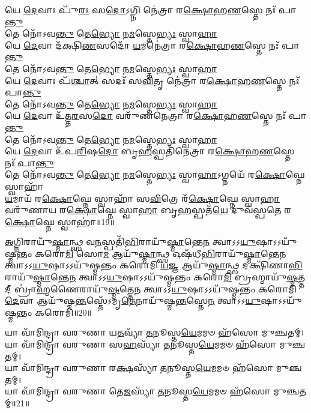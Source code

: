 𑌯𑍇 \ul{𑌦𑍇}\-𑌵𑌾𑌃 𑌪𑍁᳴\-\ul{𑌰𑌃} 𑌸\-\ul{𑌦𑍋}\-𑌽𑌗𑍍𑌨𑌿 𑌨𑍇॑𑌤𑍍𑌰𑌾 𑌰\-\ul{𑌕𑍍𑌷𑍋}\-𑌹\-\ul{𑌣}\-𑌸𑍍𑌤𑍇 𑌨𑌃᳴ 𑌪𑌾\-\ul{𑌨𑍍𑌤𑍁}\-\\
𑌤𑍇 𑌨𑍋᳴𑌽𑌵\-\ul{𑌨𑍍𑌤𑍁}  𑌤𑍇\-\ul{𑌭𑍍𑌯𑍋} 𑌨\-\ul{𑌮}\-𑌸𑍍𑌤𑍇\-\ul{𑌭𑍍𑌯𑌃} 𑌸𑍍𑌵𑌾\-\ul{𑌹𑌾}\-\\
𑌯𑍇 \ul{𑌦𑍇}\-𑌵𑌾 𑌦᳴𑌕𑍍𑌷𑌿\-\ul{𑌣}\-𑌸𑌦𑍋᳴ \ul{𑌯}\-𑌮𑌨𑍇॑𑌤𑍍𑌰𑌾 𑌰\-\ul{𑌕𑍍𑌷𑍋}\-𑌹\-\ul{𑌣}\-𑌸𑍍𑌤𑍇 𑌨𑌃᳴ 𑌪𑌾\-\ul{𑌨𑍍𑌤𑍁}\-\\
𑌤𑍇 𑌨𑍋᳴𑌽𑌵\-\ul{𑌨𑍍𑌤𑍁}  𑌤𑍇\-\ul{𑌭𑍍𑌯𑍋} 𑌨\-\ul{𑌮}\-𑌸𑍍𑌤𑍇\-\ul{𑌭𑍍𑌯𑌃} 𑌸𑍍𑌵𑌾\-\ul{𑌹𑌾}\-\\
𑌯𑍇 \ul{𑌦𑍇}\-𑌵𑌾𑌃 𑌪᳴\-\ul{𑌶𑍍𑌚𑌾}\-𑌤𑍍 𑌸𑌦𑌃᳴ 𑌸\-\ul{𑌵𑌿}\-𑌤𑍃 𑌨𑍇॑𑌤𑍍𑌰𑌾 𑌰\-\ul{𑌕𑍍𑌷𑍋}\-𑌹\-\ul{𑌣}\-𑌸𑍍𑌤𑍇 𑌨𑌃᳴ 𑌪𑌾\-\ul{𑌨𑍍𑌤𑍁}\-\\
𑌤𑍇 𑌨𑍋᳴𑌽𑌵\-\ul{𑌨𑍍𑌤𑍁}  𑌤𑍇\-\ul{𑌭𑍍𑌯𑍋} 𑌨\-\ul{𑌮}\-𑌸𑍍𑌤𑍇\-\ul{𑌭𑍍𑌯𑌃} 𑌸𑍍𑌵𑌾\-\ul{𑌹𑌾}\-\\
𑌯𑍇 \ul{𑌦𑍇}\-𑌵𑌾 𑌉᳴𑌤𑍍𑌤\-\ul{𑌰}\-𑌸\-\ul{𑌦𑍋} 𑌵𑌰𑍁᳴𑌣𑌨𑍇𑌤𑍍𑌰𑌾 𑌰\-\ul{𑌕𑍍𑌷𑍋}\-𑌹\-\ul{𑌣}\-𑌸𑍍𑌤𑍇 𑌨𑌃᳴ 𑌪𑌾\-\ul{𑌨𑍍𑌤𑍁}\-\\
𑌤𑍇 𑌨𑍋᳴𑌽𑌵\-\ul{𑌨𑍍𑌤𑍁}  𑌤𑍇\-\ul{𑌭𑍍𑌯𑍋} 𑌨\-\ul{𑌮}\-𑌸𑍍𑌤𑍇\-\ul{𑌭𑍍𑌯𑌃} 𑌸𑍍𑌵𑌾\-\ul{𑌹𑌾}\-\\
𑌯𑍇 \ul{𑌦𑍇}\-𑌵𑌾 𑌉᳴𑌪\-\ul{𑌰𑌿}\-𑌷\-\ul{𑌦𑍋} 𑌬𑍃\-\ul{𑌹}\-𑌸𑍍𑌪𑌤𑌿᳴𑌨𑍇𑌤𑍍𑌰𑌾 𑌰\-\ul{𑌕𑍍𑌷𑍋}\-𑌹\-\ul{𑌣}\-𑌸𑍍𑌤𑍇 𑌨𑌃᳴ 𑌪𑌾\-\ul{𑌨𑍍𑌤𑍁}\-\\
𑌤𑍇 𑌨𑍋᳴𑌽𑌵\-\ul{𑌨𑍍𑌤𑍁}  𑌤𑍇\-\ul{𑌭𑍍𑌯𑍋} 𑌨\-\ul{𑌮}\-𑌸𑍍𑌤𑍇\-\ul{𑌭𑍍𑌯𑌃} 𑌸𑍍𑌵𑌾\-\ul{𑌹𑌾}\-𑌽𑌗𑍍𑌨𑌯𑍇᳴ 𑌰\-\ul{𑌕𑍍𑌷𑍋}\-𑌘𑍍𑌨𑍇 𑌸𑍍𑌵𑌾𑌹𑌾᳴\\
\-\ul{𑌯}\-𑌮𑌾𑌯᳴ 𑌰\-\ul{𑌕𑍍𑌷𑍋}\-𑌘𑍍𑌨𑍇 𑌸𑍍𑌵𑌾𑌹𑌾᳴ 𑌸\-\ul{𑌵𑌿}\-𑌤𑍍𑌰𑍇 𑌰᳴\-\ul{𑌕𑍍𑌷𑍋}\-𑌘𑍍𑌨𑍇 𑌸𑍍𑌵𑌾\-\ul{𑌹𑌾}\-\\
𑌵𑌰𑍁᳴𑌣𑌾𑌯 𑌰\-\ul{𑌕𑍍𑌷𑍋}\-𑌘𑍍𑌨𑍇 𑌸𑍍𑌵𑌾\-\ul{𑌹𑌾} 𑌬𑍃\-\ul{𑌹}\-𑌸𑍍𑌪𑌤᳴\-\ul{𑌯𑍇} 𑌦𑍁𑌵᳴𑌸𑍍𑌪𑌤𑍇 𑌰\-\ul{𑌕𑍍𑌷𑍋}\-𑌘𑍍𑌨𑍇 𑌸𑍍𑌵𑌾𑌹𑌾॑॥19॥

\-\ul{𑌅}\-𑌗𑍍𑌨𑌿𑌰𑌾𑌯𑍁᳴\-\ul{𑌷𑍍𑌮𑌾}\-𑌨𑍍𑌥𑍍𑌸 𑌵\-\ul{𑌨}\-𑌸𑍍𑌪𑌤𑌿᳴\-\ul{𑌭𑌿}\-𑌰𑌾𑌯𑍁᳴\-\ul{𑌷𑍍𑌮𑌾}\-𑌨𑍍𑌤𑍇\-\ul{𑌨} 𑌤𑍍𑌵𑌾𑌽𑌽\-\ul{𑌯𑍁}\-𑌷𑌾\-𑌽𑌽𑌯𑍁᳴𑌷𑍍𑌮𑌨𑍍𑌤𑌂 𑌕𑌰𑍋\-\ul{𑌮𑌿}\-
𑌸𑍋\-\ul{𑌮} 𑌆𑌯𑍁᳴\-\ul{𑌷𑍍𑌮𑌾}\-𑌨𑍍𑌥𑍍𑌸 𑌓𑌷᳴𑌧𑍀\-\ul{𑌭𑌿}\-𑌰𑌾𑌯𑍁᳴\-\ul{𑌷𑍍𑌮𑌾}\-𑌨𑍍𑌤𑍇\-\ul{𑌨} 𑌤𑍍𑌵𑌾𑌽𑌽\-\ul{𑌯𑍁}\-𑌷𑌾\-𑌽𑌽𑌯𑍁᳴𑌷𑍍𑌮𑌨𑍍𑌤𑌂 𑌕𑌰𑍋𑌮𑌿
\-\ul{𑌯}\-𑌜𑍍𑌞 𑌆𑌯𑍁᳴\-\ul{𑌷𑍍𑌮𑌾}\-𑌨𑍍𑌥𑍍𑌸 𑌦𑌕𑍍𑌷𑌿᳴𑌣𑌾\-\ul{𑌭𑌿}\-𑌰𑌾𑌯𑍁᳴\-\ul{𑌷𑍍𑌮𑌾}\-𑌨𑍍𑌤𑍇\-\ul{𑌨} 𑌤𑍍𑌵𑌾𑌽𑌽\-\ul{𑌯𑍁}\-𑌷𑌾\-𑌽𑌽𑌯𑍁᳴𑌷𑍍𑌮𑌨𑍍𑌤𑌂 𑌕𑌰𑍋\-\ul{𑌮𑌿}\-
𑌬𑍍𑌰𑌹𑍍𑌮𑌾𑌯𑍁᳴\-\ul{𑌷𑍍𑌮}\-𑌤𑍍𑌤𑌦𑍍 𑌬𑍍𑌰𑌾॑\-\ul{𑌹𑍍𑌮}\-𑌣𑍈𑌰𑌾𑌯𑍁᳴\-\ul{𑌷𑍍𑌮}\-𑌤𑍍𑌤𑍇\-\ul{𑌨} 𑌤𑍍𑌵𑌾𑌽𑌽\-\ul{𑌯𑍁}\-𑌷𑌾\-𑌽𑌽𑌯𑍁᳴𑌷𑍍𑌮𑌨𑍍𑌤𑌂 𑌕𑌰𑍋𑌮𑌿
\-\ul{𑌦𑍇}\-𑌵𑌾 𑌆𑌯𑍁᳴𑌷𑍍𑌮\-\ul{𑌨𑍍𑌤}\-𑌸𑍍𑌤𑍇᳴𑌽𑌮𑍃\-\ul{𑌤𑍇}\-𑌨𑌾𑌯𑍁᳴𑌷𑍍𑌮\-\ul{𑌨𑍍𑌤}\-𑌸𑍍𑌤𑍇\-\ul{𑌨} 𑌤𑍍𑌵𑌾\-𑌽𑌽\-\ul{𑌯𑍁}\-𑌷𑌾𑌽𑌽𑌯𑍁᳴𑌷𑍍𑌮𑌨𑍍𑌤𑌂 𑌕𑌰𑍋𑌮𑌿॥20॥

𑌯𑌾 𑌵𑌾᳴𑌮𑌿𑌨𑍍𑌦𑍍𑌰𑌾 𑌵𑌰𑍁𑌣𑌾 𑌯\-\ul{𑌤}\-𑌵𑍍𑌯𑌾᳴ \ul{𑌤}\-𑌨𑍂𑌸𑍍𑌤\-\ul{𑌯𑍇}\-𑌮𑌮𑍞 𑌹᳴𑌸𑍋 𑌮𑍁𑌞𑍍𑌚𑌤𑌮𑍍।\\
𑌯𑌾 𑌵𑌾᳴𑌮𑌿𑌨𑍍𑌦𑍍𑌰𑌾 𑌵𑌰𑍁𑌣𑌾 𑌸\-\ul{𑌹}\-𑌸𑍍𑌯𑌾᳴ \ul{𑌤}\-𑌨𑍂𑌸𑍍𑌤\-\ul{𑌯𑍇}\-𑌮𑌮𑍞 𑌹᳴𑌸𑍋 𑌮𑍁𑌞𑍍𑌚𑌤𑌮𑍍।\\
𑌯𑌾 𑌵𑌾᳴𑌮𑌿𑌨𑍍𑌦𑍍𑌰𑌾 𑌵𑌰𑍁𑌣𑌾 𑌰\-\ul{𑌕𑍍𑌷}\-𑌸𑍍𑌯𑌾᳴ \ul{𑌤}\-𑌨𑍂𑌸𑍍𑌤\-\ul{𑌯𑍇}\-𑌮𑌮𑍞 𑌹᳴𑌸𑍋 𑌮𑍁𑌞𑍍𑌚𑌤𑌮𑍍।\\
𑌯𑌾 𑌵𑌾᳴𑌮𑌿𑌨𑍍𑌦𑍍𑌰𑌾 𑌵𑌰𑍁𑌣𑌾 𑌤𑍇\-\ul{𑌜}\-𑌸𑍍𑌯𑌾᳴ \ul{𑌤}\-𑌨𑍂𑌸𑍍𑌤\-\ul{𑌯𑍇}\-𑌮𑌮𑍞 𑌹᳴𑌸𑍋 𑌮𑍁𑌞𑍍𑌚𑌤𑌮𑍍॥21॥

